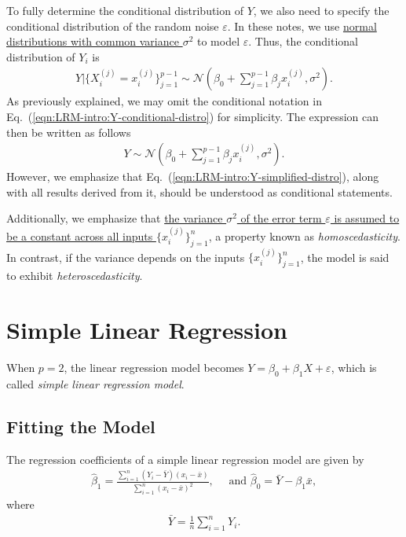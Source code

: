 \documentclass{book}
\begin{document}
To fully determine the conditional distribution of $Y$, we also need to specify the conditional distribution of the random noise $\varepsilon$. In these notes, we use \ul{normal distributions with common variance $\sigma^2$} to model $\varepsilon$. Thus, the conditional distribution of $Y_i$ is 
\begin{align}
    \label{eqn:LRM-intro:Y-conditional-distro}
    Y\bigg|\Big\{ X_i^{(j)} = x_i^{(j)}\Big\}_{j=1}^{p-1}
    \sim
    \mathcal{N}
    \left(
    \beta_0 + \sum_{j=1}^{p-1} \beta_jx_i^{(j)}, \sigma^2
    \right).
\end{align}
As previously explained, we may omit the conditional notation in Eq.~(\ref{eqn:LRM-intro:Y-conditional-distro}) for simplicity. The expression can then be written as follows
\begin{align}
    \label{eqn:LRM-intro:Y-simplified-distro}
    Y
    \sim
    \mathcal{N}
    \left(
    \beta_0 + \sum_{j=1}^{p-1} \beta_jx_i^{(j)}, \sigma^2
    \right).
\end{align}
However, we emphasize that Eq.~(\ref{eqn:LRM-intro:Y-simplified-distro}), along with all results derived from it, should be understood as conditional statements.

Additionally, we emphasize that \ul{the variance $\sigma^2$ of the error term $\varepsilon$ is assumed to be a constant across all inputs $\{x_i^{(j)}\}_{j=1}^n$}, a property known as \textit{homoscedasticity}. In contrast, if the variance depends on the inputs $\{x_i^{(j)}\}_{j=1}^n$, the model is said to exhibit \textit{heteroscedasticity}.

\section{Simple Linear Regression}

When $p=2$, the linear regression model becomes $Y = \beta_0 + \beta_1 X + \varepsilon$, which is called \textit{simple linear regression model}.

\subsection{Fitting the Model}

\theorem The regression coefficients of a simple linear regression model are given by
\begin{align}
    \hat{\beta}_1 
    = 
    \frac{\sum_{i=1}^{n}(Y_i-\bar{Y})(x_i - \bar{x})}{\sum_{i=1}^{n}(x_i - \bar{x})^2}, 
    \quad \text{ and }
    \hat{\beta}_0
    = \bar{Y} - \beta_1\bar{x},
    \label{eqn:SLR:regression-coefficients}
\end{align}
where 
\begin{align}
    \bar{Y} = \frac{1}{n}\sum_{i=1}^{n}Y_i.
\end{align}
\end{document}

